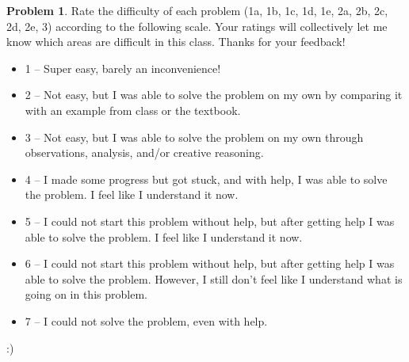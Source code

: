 \documentclass[11pt,oneside]{amsart}
\theoremstyle{definition}
\newtheorem{problem}{Problem}
\theoremstyle{plain}
\begin{document}
\begin{problem}
Rate the difficulty of each problem (1a, 1b, 1c, 1d, 1e, 2a, 2b, 2c, 2d, 2e, 3) according to the following scale. Your ratings will collectively let me know which areas are difficult in this class. Thanks for your feedback!
\begin{itemize}
  \item 1 -- Super easy, barely an inconvenience!
  \item 2 -- Not easy, but I was able to solve the problem on my own by comparing it with an example from class or the textbook.
  \item 3 -- Not easy, but I was able to solve the problem on my own through observations, analysis, and/or creative reasoning.
  \item 4 -- I made some progress but got stuck, and with help, I was able to solve the problem. I feel like I understand it now.
  \item 5 -- I could not start this problem without help, but after getting help I was able to solve the problem. I feel like I understand it now.
  \item 6 -- I could not start this problem without help, but after getting help I was able to solve the problem. However, I still don't feel like I understand what is going on in this problem.
  \item 7 -- I could not solve the problem, even with help.
\end{itemize}
\end{problem}
\begin{solution}
  :)
\end{solution}
\end{document}

